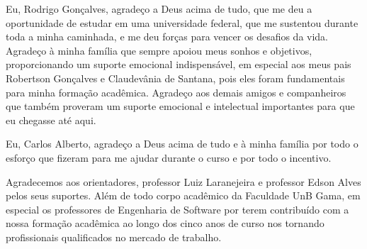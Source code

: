 \begin{agradecimentos}
Eu, Rodrigo Gonçalves, agradeço a Deus acima de tudo, que me deu a oportunidade de estudar em uma universidade federal, que me sustentou durante toda a minha caminhada, e me deu forças para vencer os desafios da vida. Agradeço à minha família que sempre apoiou meus sonhos e objetivos, proporcionando um suporte emocional indispensável, em especial aos meus pais Robertson Gonçalves e Claudevânia de Santana, pois eles foram fundamentais para minha formação acadêmica. Agradeço aos demais amigos e companheiros que também proveram um suporte emocional e intelectual importantes para que eu chegasse até aqui.

Eu, Carlos Alberto, agradeço a Deus acima de tudo e à minha família por todo o esforço que fizeram para me ajudar durante o curso e por todo o incentivo.

Agradecemos aos orientadores, professor Luiz Laranejeira e professor Edson Alves pelos seus suportes. Além de todo corpo acadêmico da Faculdade UnB Gama, em especial os professores de Engenharia de Software por terem contribuído com a nossa formação acadêmica ao longo dos cinco anos de curso nos tornando profissionais qualificados no mercado de trabalho.
\end{agradecimentos}

